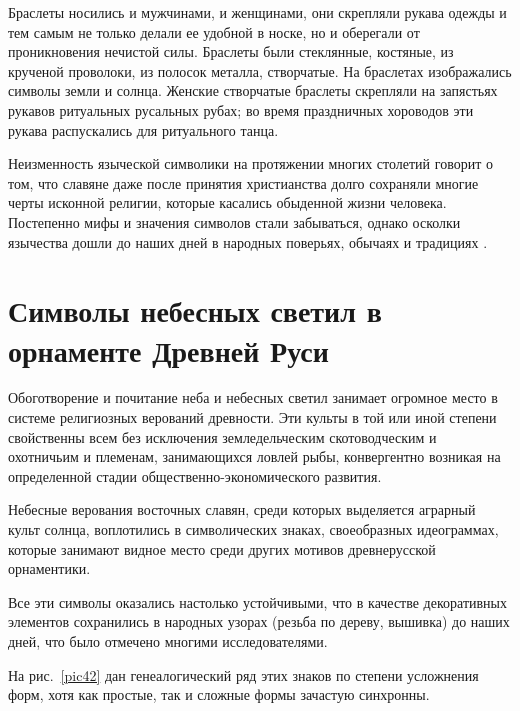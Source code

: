 \documentclass[pscyr,chapters]{hedwork}
\begin{document}
  Браслеты носились и мужчинами, и женщинами, они скрепляли рукава одежды и тем
  самым не только делали ее удобной в носке, но и оберегали от проникновения
  нечистой силы. Браслеты были стеклянные, костяные, из крученой проволоки, из
  полосок металла, створчатые. На браслетах изображались символы земли и солнца.
  Женские створчатые браслеты скрепляли на запястьях рукавов ритуальных
  русальных рубах; во время праздничных хороводов эти рукава распускались для
  ритуального танца.

  Неизменность языческой символики на протяжении многих столетий говорит о том,
  что славяне даже после принятия христианства долго сохраняли многие черты
  исконной религии, которые касались обыденной жизни человека. Постепенно мифы и
  значения символов стали забываться, однако осколки язычества дошли до наших
  дней в народных поверьях, обычаях и традициях \cite{3}.

  \chapter{Символы небесных светил в орнаменте Древней Руси}
 
  Обоготворение и почитание неба и небесных светил занимает огромное место в
  системе религиозных верований древности. Эти культы в той или иной степени
  свойственны всем без исключения земледельческим скотоводческим и охотничьим и
  племенам, занимающихся ловлей рыбы, конвергентно возникая на определенной
  стадии общественно-экономического развития.

  Небесные верования восточных славян, среди которых выделяется аграрный культ
  солнца, воплотились в символических знаках, своеобразных идеограммах, которые
  занимают видное место среди других мотивов древнерусской орнаментики.

  Все эти символы оказались настолько устойчивыми, что в качестве декоративных
  элементов сохранились в народных узорах (резьба по дереву, вышивка) до наших
  дней, что было отмечено многими исследователями.

  На рис.~\ref{pic42} дан генеалогический ряд этих знаков по степени усложнения
  форм, хотя как простые, так и сложные формы зачастую синхронны.
 
\end{document}
